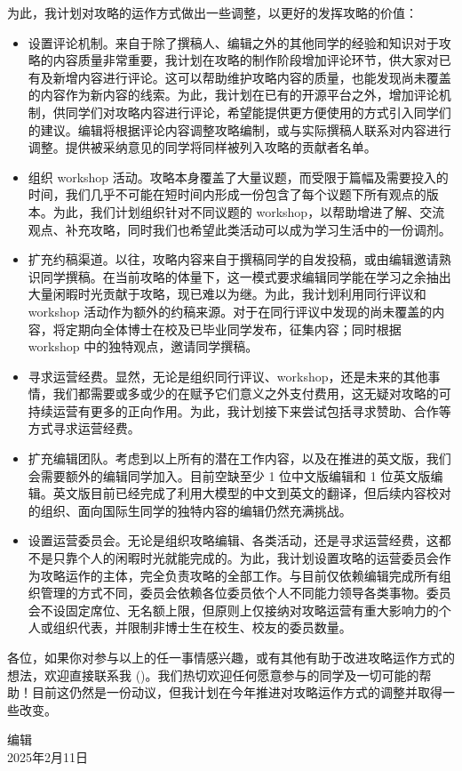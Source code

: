 为此，我计划对攻略的运作方式做出一些调整，以更好的发挥攻略的价值：
\begin{itemize}
    \item 设置评论机制。来自于除了撰稿人、编辑之外的其他同学的经验和知识对于攻略的内容质量非常重要，我计划在攻略的制作阶段增加评论环节，供大家对已有及新增内容进行评论。这可以帮助维护攻略内容的质量，也能发现尚未覆盖的内容作为新内容的线索。为此，我计划在已有的开源平台之外，增加评论机制，供同学们对攻略内容进行评论，希望能提供更方便使用的方式引入同学们的建议。编辑将根据评论内容调整攻略编制，或与实际撰稿人联系对内容进行调整。提供被采纳意见的同学将同样被列入攻略的贡献者名单。
    \item 组织 workshop 活动。攻略本身覆盖了大量议题，而受限于篇幅及需要投入的时间，我们几乎不可能在短时间内形成一份包含了每个议题下所有观点的版本。为此，我们计划组织针对不同议题的 workshop，以帮助增进了解、交流观点、补充攻略，同时我们也希望此类活动可以成为学习生活中的一份调剂。
    \item 扩充约稿渠道。以往，攻略内容来自于撰稿同学的自发投稿，或由编辑邀请熟识同学撰稿。在当前攻略的体量下，这一模式要求编辑同学能在学习之余抽出大量闲暇时光贡献于攻略，现已难以为继。为此，我计划利用同行评议和 workshop 活动作为额外的约稿来源。对于在同行评议中发现的尚未覆盖的内容，将定期向全体博士在校及已毕业同学发布，征集内容；同时根据 workshop 中的独特观点，邀请同学撰稿。
    \item 寻求运营经费。显然，无论是组织同行评议、workshop，还是未来的其他事情，我们都需要或多或少的在赋予它们意义之外支付费用，这无疑对攻略的可持续运营有更多的正向作用。为此，我计划接下来尝试包括寻求赞助、合作等方式寻求运营经费。
    \item 扩充编辑团队。考虑到以上所有的潜在工作内容，以及在推进的英文版，我们会需要额外的编辑同学加入。目前空缺至少 1 位中文版编辑和 1 位英文版编辑。英文版目前已经完成了利用大模型的中文到英文的翻译，但后续内容校对的组织、面向国际生同学的独特内容的编辑仍然充满挑战。
    \item 设置运营委员会。无论是组织攻略编辑、各类活动，还是寻求运营经费，这都不是只靠个人的闲暇时光就能完成的。为此，我计划设置攻略的运营委员会作为攻略运作的主体，完全负责攻略的全部工作。与目前仅依赖编辑完成所有组织管理的方式不同，委员会依赖各位委员依个人不同能力领导各类事物。委员会不设固定席位、无名额上限，但原则上仅接纳对攻略运营有重大影响力的个人或组织代表，并限制非博士生在校生、校友的委员数量。
    
\end{itemize}

\vspace{5mm}

各位，如果你对参与以上的任一事情感兴趣，或有其他有助于改进攻略运作方式的想法，欢迎直接联系我 ()。我们热切欢迎任何愿意参与的同学及一切可能的帮助！目前这仍然是一份动议，但我计划在今年推进对攻略运作方式的调整并取得一些改变。

\begin{flushright}
    编辑 \Shiyao\\
    2025年2月11日
\end{flushright}